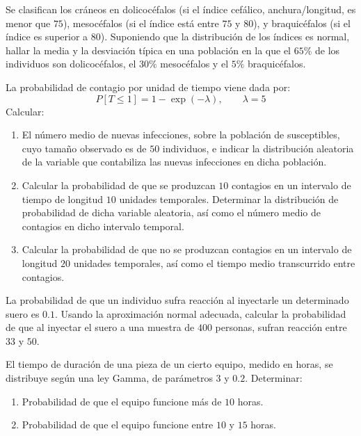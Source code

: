 \begin{ejercicio}
    Se clasifican los cráneos en dolicocéfalos (si el índice cefálico, anchura/longitud, es menor que $75$), mesocéfalos (si el índice está entre $75$ y $80$), y braquicéfalos (si el índice es superior a $80$). Suponiendo que la distribución de los índices es normal, hallar la media y la desviación típica en una población en la que el $65\%$ de los individuos son dolicocéfalos, el $30\%$ mesocéfalos y el $5\%$ braquicéfalos.
\end{ejercicio}

\begin{ejercicio}
    La probabilidad de contagio por unidad de tiempo viene dada por:
    \begin{equation*}
        P[T \leq 1] = 1-\exp(-\lambda), \qquad \lambda = 5
    \end{equation*}
    Calcular:
    \begin{enumerate}
        \item El número medio de nuevas infecciones, sobre la población de susceptibles, cuyo tamaño observado es de $50$ individuos, e indicar la distribución aleatoria de la variable que contabiliza las nuevas infecciones en dicha población.
        \item Calcular la probabilidad de que se produzcan $10$ contagios en un intervalo de tiempo de longitud $10$ unidades temporales. Determinar la distribución de probabilidad de dicha variable aleatoria, así como el número medio de contagios en dicho intervalo temporal.
        \item Calcular la probabilidad de que no se produzcan contagios en un intervalo de longitud $20$ unidades temporales, así como
        el tiempo medio transcurrido entre contagios.
    \end{enumerate}
\end{ejercicio}

\begin{ejercicio}
    La probabilidad de que un individuo sufra reacción al inyectarle un determinado suero es $0.1$. Usando la aproximación normal adecuada, calcular la probabilidad de que al inyectar el suero a una muestra de $400$ personas, sufran reacción entre $33$ y $50$.
\end{ejercicio}

\begin{ejercicio}
    El tiempo de duración de una pieza de un cierto equipo, medido en horas, se distribuye según una ley Gamma, de parámetros $3$ y $0.2$. Determinar:
    \begin{enumerate}
        \item Probabilidad de que el equipo funcione más de $10$ horas.
        \item Probabilidad de que el equipo funcione entre $10$ y $15$ horas.
    \end{enumerate}
\end{ejercicio}

